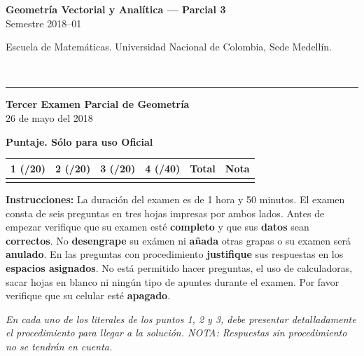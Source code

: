 \documentclass[11pt]{article}
\newcommand{\nota}[1]{{\small\itshape\color{unalblue!70!black} #1}}
\begin{document}
\noindent
\begin{minipage}[t]{0.6\linewidth}
{\small\bfseries Geometría Vectorial y Analítica --- Parcial 3}\\
{\small Semestre 2018--01}
\end{minipage}%
\hfill
\begin{minipage}[t]{0.35\linewidth}
\raggedleft\small Escuela de Matemáticas. Universidad Nacional de Colombia, Sede Medellín.
\end{minipage}\\[2pt]
\rule{\linewidth}{0.6pt}

\begin{center}
\textbf{Tercer Examen Parcial de Geometría}\\
26 de mayo del 2018
\end{center}

\vspace{6pt}
\textbf{Puntaje. Sólo para uso Oficial}

\begin{center}
\begin{tabular}{|c|c|c|c|c|c|}
\hline
1 (/20) & 2 (/20) & 3 (/20) & 4 (/40) & Total & Nota \\
\hline
 & & & & & \\
\hline
\end{tabular}
\end{center}

\vspace{10pt}
\textbf{Instrucciones:} La duración del examen es de 1 hora y 50 minutos. El examen consta de seis preguntas en tres hojas impresas por ambos lados. Antes de empezar verifique que su examen esté \textbf{completo} y que sus \textbf{datos} sean \textbf{correctos}. No \textbf{desengrape} su exámen ni \textbf{añada} otras grapas o su examen será \textbf{anulado}. En las preguntas con procedimiento \textbf{justifique} sus respuestas en los \textbf{espacios asignados}. No está permitido hacer preguntas, el uso de calculadoras, sacar hojas en blanco ni ningún tipo de apuntes durante el examen. Por favor verifique que su celular esté \textbf{apagado}.

\vspace{6pt}
\nota{En cada uno de los literales de los puntos 1, 2 y 3, debe presentar detalladamente el procedimiento para llegar a la solución. NOTA: Respuestas sin procedimiento no se tendrán en cuenta.}
\end{document}
